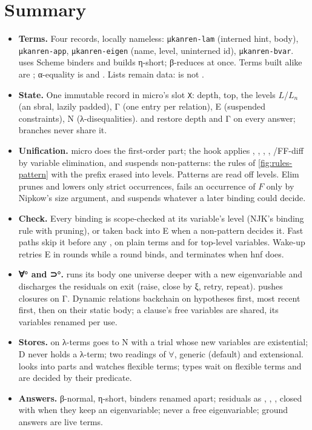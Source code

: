 \section{Summary}\label{sec:module-summary}

\begin{itemize}\emergencystretch=2em
  \item \textbf{Terms.} Four records, locally nameless: \texttt{μkanren-\allowbreak lam} (interned hint, body),
    \texttt{μkanren-\allowbreak app}, \texttt{μkanren-\allowbreak eigen} (name, level, uninterned id), \texttt{μkanren-\allowbreak bvar}.  uses
    Scheme binders and builds η-short;  β-reduces at once. Terms built alike are ; α-equality is
     and . Lists remain data:  is not .
  \item \textbf{State.} One immutable record in micro's slot \texttt{X}: depth, top, the levels $L$/$L_n$ (an
    sbral, lazily padded), Γ (one entry per relation), E (suspended constraints), N (λ-disequalities). 
    and  restore depth and Γ on every answer; branches never share it.
  \item \textbf{Unification.} micro does the first-order part; the hook applies , ,
    , , /FF-diff by variable elimination, and suspends
    non-patterns: the rules of \cref{fig:rules-pattern} with the prefix erased into levels. Patterns are read
    off levels. Elim prunes and lowers only strict occurrences, fails an
    occurrence of $F$ only by Nipkow's size argument, and suspends whatever a later binding could decide.
  \item \textbf{Check.} Every binding is scope-checked at its variable's level (NJK's binding rule with pruning),
    or taken back into E when a non-pattern decides it. Fast paths skip it before any , on plain terms and
    for top-level variables. Wake-up retries E in rounds while a round binds, and terminates when hnf does.
  \item \textbf{∀° and ⊃°.}  runs its body one universe deeper with a new eigenvariable and discharges
    the residuals on exit (raise, close by ξ, retry, repeat).  pushes closures on Γ. Dynamic relations
    backchain on hypotheses first, most recent first, then on their static body; a clause's free variables are
    shared, its  variables renamed per use.
  \item \textbf{Stores.}  on λ-terms goes to N with a trial whose new variables are existential;
    D never holds a λ-term; two readings of $\forall$, generic (default) and extensional.  looks into
    parts and watches flexible terms; types wait on flexible terms and are decided by their predicate.
  \item \textbf{Answers.} β-normal, η-short, binders renamed apart; residuals as ,
    , , closed with  when they keep an eigenvariable; never a free
    eigenvariable; ground answers are live terms.
\end{itemize}

